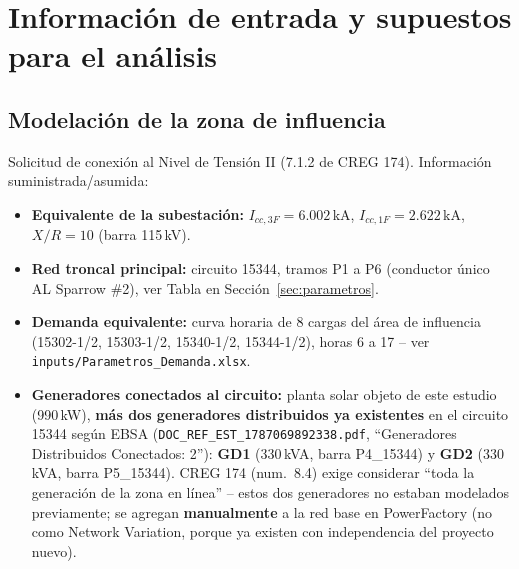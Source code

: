 \documentclass[11pt,a4paper]{article}
\begin{document}
\section{Informaci\'on de entrada y supuestos para el an\'alisis}

\subsection{Modelaci\'on de la zona de influencia}
Solicitud de conexi\'on al Nivel de Tensi\'on II (7.1.2 de CREG 174). Informaci\'on suministrada/asumida:
\begin{itemize}
    \item \textbf{Equivalente de la subestaci\'on:} $I_{cc,3F} = 6.002$\,kA, $I_{cc,1F} = 2.622$\,kA, $X/R = 10$ (barra 115\,kV).
    \item \textbf{Red troncal principal:} circuito 15344, tramos P1 a P6 (conductor \'unico AL Sparrow \#2), ver Tabla en Secci\'on~\ref{sec:parametros}.
    \item \textbf{Demanda equivalente:} curva horaria de 8 cargas del \'area de influencia (15302-1/2, 15303-1/2, 15340-1/2, 15344-1/2), horas 6 a 17 -- ver \texttt{inputs/Parametros\_Demanda.xlsx}.
    \item \textbf{Generadores conectados al circuito:} planta solar objeto de este estudio (990\,kW), \textbf{m\'as dos generadores distribuidos ya existentes} en el circuito 15344 seg\'un EBSA (\texttt{DOC\_REF\_EST\_1787069892338.pdf}, ``Generadores Distribuidos Conectados: 2''): \textbf{GD1} (330\,kVA, barra P4\_15344) y \textbf{GD2} (330\,kVA, barra P5\_15344). CREG 174 (num.\ 8.4) exige considerar ``toda la generaci\'on de la zona en l\'inea'' -- estos dos generadores no estaban modelados previamente; se agregan \textbf{manualmente} a la red base en PowerFactory (no como Network Variation, porque ya existen con independencia del proyecto nuevo).


\end{itemize}
\end{document}
